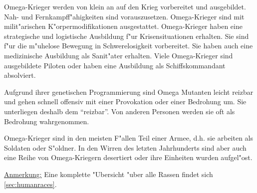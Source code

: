 \begin{description}
        Omega-Krieger werden von klein an auf den Krieg vorbereitet und ausgebildet. Nah- und Fernkampff"ahigkeiten sind vorauszusetzen. 
        Omega-Krieger sind mit milit"arischen K"orpermodifikationen ausgestattet. Omega-Krieger haben eine strategische und logistische Ausbildung f"ur Krisensituationen erhalten. Sie sind f"ur die m"uhelose Bewegung in Schwerelosigkeit vorbereitet. Sie haben auch eine medizinische Ausbildung als Sanit"ater erhalten. Viele Omega-Krieger sind ausgebildete Piloten oder haben eine Ausbildung als Schiffskommandant absolviert. 
        
        Aufgrund ihrer genetischen Programmierung sind Omega Mutanten leicht reizbar und gehen schnell offensiv mit einer Provokation oder einer Bedrohung um. Sie unterliegen deshalb dem  ``reizbar''. Von anderen Personen werden sie oft als Bedrohung wahrgenommen.

        Omega-Krieger sind in den meisten F"allen Teil einer Armee, d.h. sie arbeiten als Soldaten oder S"oldner. In den Wirren des letzten Jahrhunderts sind aber auch eine Reihe von Omega-Kriegern desertiert oder ihre Einheiten wurden aufgel"ost.
\end{description}

\underline{Anmerkung:} Eine komplette "Ubersicht "uber alle Rassen findet sich \cref{sec:humanraces}.
